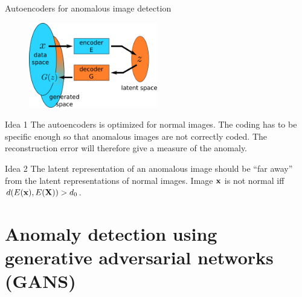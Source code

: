 \documentclass[xcolor=pdftex,dvipsnames,table,mathserif]{beamer}
\begin{document}
\begin{frame}{Autoencoders for anomalous image detection}

\begin{figure}[ht]
  \centering
  \includegraphics[width=0.5\textwidth]{ae.png}
\end{figure}

\begin{block}{Idea 1}
  The autoencoders is optimized for normal images. The coding has to be specific enough so that anomalous images are not correctly coded. The reconstruction error will therefore give a measure of the anomaly.
\end{block}

\begin{block}{Idea 2}
  The latent representation of an anomalous image should be ``far away'' from the latent representations of normal images. Image $\mathbf{x}$ is not normal iff $d(E(\mathbf{x}), E(\mathbf{X})) > d_0$.
\end{block}

\end{frame}



\section{Anomaly detection using generative adversarial networks (GANS)}
\end{document}

